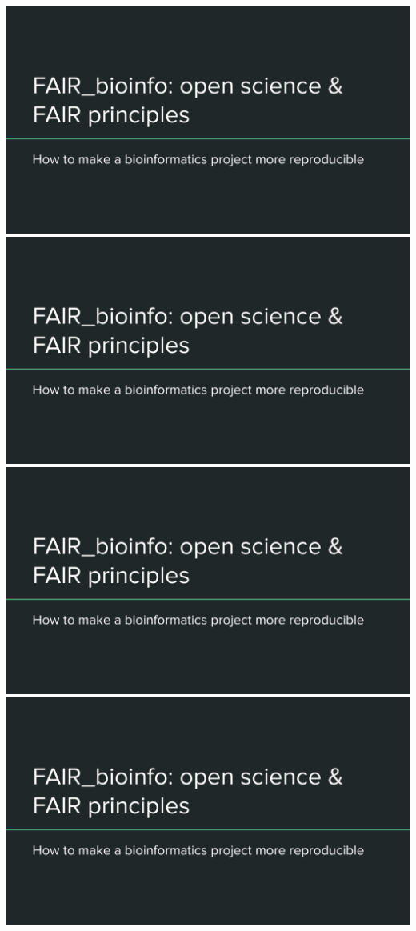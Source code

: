 \includegraphics[page=4,scale=0.55]{01_OS_and_FAIR_intro.pdf}
\includegraphics[page=5,scale=0.55]{01_OS_and_FAIR_intro.pdf}
\includegraphics[page=6,scale=0.55]{01_OS_and_FAIR_intro.pdf}
\includegraphics[page=7,scale=0.55]{01_OS_and_FAIR_intro.pdf}


